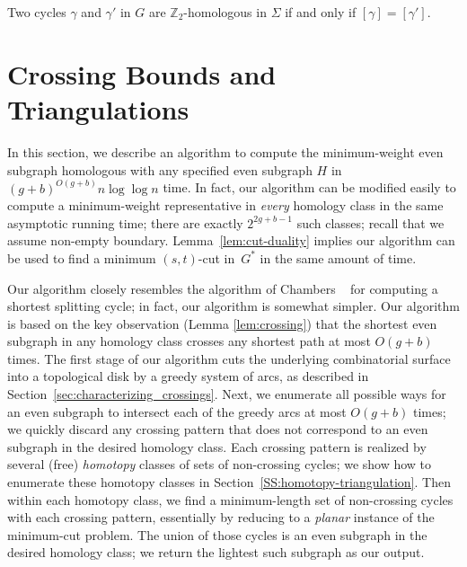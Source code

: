 \documentclass[letterpaper,review]{siamart190516}
\def\Z{\mathbb{Z}}
\def\cycle{\gamma}
\begin{document}
\begin{corollary}
Two cycles $\cycle$ and $\cycle'$ in $G$ are $\Z_2$-homologous in $\Sigma$ if and only if $[\cycle] = [\cycle']$.
\end{corollary}

\section{Crossing Bounds and Triangulations}
\label{sec:crossing}

In this section, we describe an
algorithm to compute the minimum-weight even subgraph homologous with any specified even subgraph 
$H$ in $(g+b)^{O(g+b)}n\log \log n$ time.  In fact, our algorithm can be
modified easily to compute a minimum-weight representative in
\emph{every} homology class in the same asymptotic running time;
there are exactly $2^{2g+b-1}$ such classes; recall that we assume non-empty boundary.
Lemma~\ref{lem:cut-duality} implies our algorithm can be used to find a minimum $(s,t)$-cut in~$G^*$ in the same amount of time.

Our algorithm closely resembles the algorithm of Chambers \etal~\cite{ccelw-scsih-08} for computing a shortest splitting cycle; in fact, our algorithm is somewhat simpler.  Our algorithm is based on the key observation (Lemma \ref{lem:crossing})  that the shortest even subgraph in any homology class crosses any shortest path at most $O(g+b)$ times.  The first stage of our algorithm cuts the underlying combinatorial surface into a topological disk by a greedy system of arcs, as described in Section~\ref{sec:characterizing_crossings}.  Next, we enumerate all possible ways for an even subgraph to intersect each of the greedy arcs at most $O(g+b)$ times; we quickly discard any crossing pattern that does not correspond to an even subgraph in the desired homology class.  Each crossing pattern is realized by several (free) \emph{homotopy} classes of sets of non-crossing cycles; we show how to enumerate these homotopy classes in Section~\ref{SS:homotopy-triangulation}.  Then within each homotopy class, we find a minimum-length set of non-crossing cycles with each crossing pattern, essentially by reducing to a \emph{planar} instance of the minimum-cut problem.  The union of those cycles is an even subgraph in the desired homology class; we return the lightest such subgraph as our output.
\end{document}
